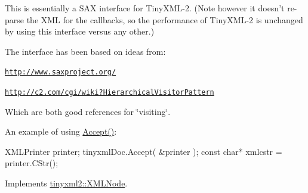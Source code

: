 This is essentially a S\-A\-X interface for Tiny\-X\-M\-L-\/2. (Note however it doesn't re-\/parse the X\-M\-L for the callbacks, so the performance of Tiny\-X\-M\-L-\/2 is unchanged by using this interface versus any other.)

The interface has been based on ideas from\-:


\begin{DoxyItemize}
\item \href{http://www.saxproject.org/}{\tt http\-://www.\-saxproject.\-org/}
\item \href{http://c2.com/cgi/wiki?HierarchicalVisitorPattern}{\tt http\-://c2.\-com/cgi/wiki?\-Hierarchical\-Visitor\-Pattern}
\end{DoxyItemize}

Which are both good references for \char`\"{}visiting\char`\"{}.

An example of using \hyperlink{classtinyxml2_1_1_x_m_l_document_aa08503d24898bf9992ae5e5fb8b0cf87}{Accept()}\-: \begin{DoxyVerb}XMLPrinter printer;
tinyxmlDoc.Accept( &printer );
const char* xmlcstr = printer.CStr();
\end{DoxyVerb}
 

Implements \hyperlink{classtinyxml2_1_1_x_m_l_node_a81e66df0a44c67a7af17f3b77a152785}{tinyxml2\-::\-X\-M\-L\-Node}.

